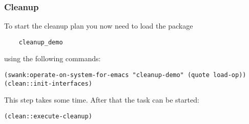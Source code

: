 \documentclass[main.tex]{subfiles}
\begin{document}
	\subsubsection{Cleanup}
	To start the cleanup plan you now need to load the package \begin{verbatim}
	cleanup_demo
	\end{verbatim}
	 using the following commands:
	\begin{lstlisting}
(swank:operate-on-system-for-emacs "cleanup-demo" (quote load-op))
(clean::init-interfaces)
\end{lstlisting}
This step takes some time. After that the task can be started:
\begin{lstlisting}
(clean::execute-cleanup)
\end{lstlisting}
\end{document}
